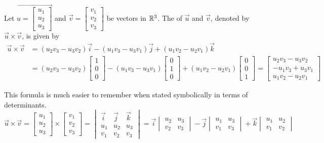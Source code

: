 \documentclass{ximera}
\begin{document}
\begin{definition}\label{def:crossproduct} Let $\vec{u=\begin{bmatrix}u_1\\u_2\\u_3\end{bmatrix}}$ and $\vec{v}=\begin{bmatrix}v_1\\v_2\\v_3\end{bmatrix}$ be vectors in $\mathbb{R}^3$.  The  of $\vec{u}$ and $\vec{v}$, denoted by $\vec{u}\times\vec{v}$, is given by
\begin{align*}
\vec{u}\times\vec{v}&=(u_2v_3-u_3v_2)\vec{i}-(u_1v_3-u_3v_1)\vec{j}+(u_1v_2-u_2v_1)\vec{k} \\
&=(u_2v_3-u_3v_2)\begin{bmatrix}1\\0\\0\end{bmatrix}-(u_1v_3-u_3v_1)\begin{bmatrix}0\\1\\0\end{bmatrix}+(u_1v_2-u_2v_1)\begin{bmatrix}0\\0\\1\end{bmatrix}=\begin{bmatrix}u_2v_3-u_3v_2\\-u_1v_3+u_3v_1\\u_1v_2-u_2v_1\end{bmatrix}
\end{align*}
\end{definition}

This formula is much easier to remember when stated symbolically in terms of determinants.
$$\vec{u}\times \vec{v}=\begin{bmatrix}u_1\\u_2\\u_3\end{bmatrix}\times\begin{bmatrix}v_1\\v_2\\v_3\end{bmatrix}=\begin{vmatrix}\vec{i}&\vec{j}&\vec{k}\\u_1&u_2&u_3\\v_1&v_2&v_3\end{vmatrix}=\vec{i}\begin{vmatrix}u_2&u_3\\v_2&v_3\end{vmatrix}-\vec{j}\begin{vmatrix}u_1&u_3\\v_1&v_3\end{vmatrix}+\vec{k}\begin{vmatrix}u_1&u_2\\v_1&v_2\end{vmatrix} $$
\end{document}
